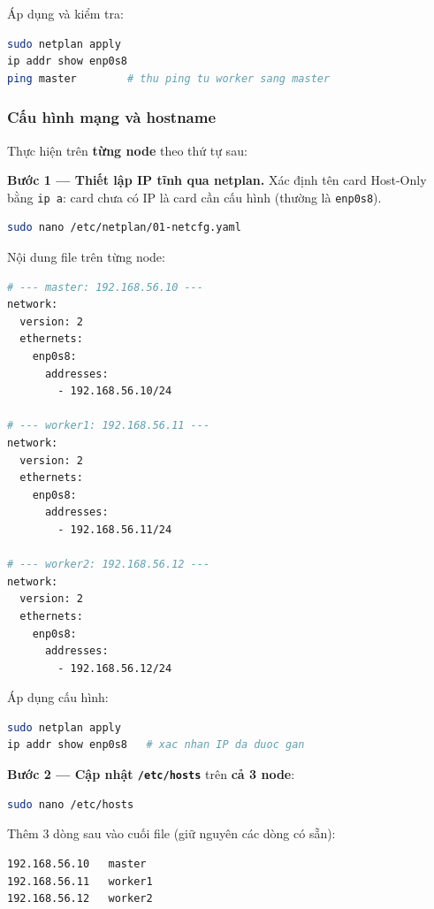 Áp dụng và kiểm tra:

\begin{lstlisting}[language=bash, numbers=none]
sudo netplan apply
ip addr show enp0s8
ping master        # thu ping tu worker sang master
\end{lstlisting}


\subsubsection{Cấu hình mạng và hostname}

Thực hiện trên \textbf{từng node} theo thứ tự sau:

\textbf{Bước 1 — Thiết lập IP tĩnh qua netplan.}
Xác định tên card Host-Only bằng \texttt{ip a}: card chưa có IP là card cần cấu hình (thường là \texttt{enp0s8}).

\begin{lstlisting}[language=bash, numbers=none]
sudo nano /etc/netplan/01-netcfg.yaml
\end{lstlisting}

Nội dung file trên từng node:

\begin{lstlisting}[language=bash, numbers=none]
# --- master: 192.168.56.10 ---
network:
  version: 2
  ethernets:
    enp0s8:
      addresses:
        - 192.168.56.10/24

# --- worker1: 192.168.56.11 ---
network:
  version: 2
  ethernets:
    enp0s8:
      addresses:
        - 192.168.56.11/24

# --- worker2: 192.168.56.12 ---
network:
  version: 2
  ethernets:
    enp0s8:
      addresses:
        - 192.168.56.12/24
\end{lstlisting}

Áp dụng cấu hình:

\begin{lstlisting}[language=bash, numbers=none]
sudo netplan apply
ip addr show enp0s8   # xac nhan IP da duoc gan
\end{lstlisting}

\textbf{Bước 2 — Cập nhật \texttt{/etc/hosts}} trên \textbf{cả 3 node}:

\begin{lstlisting}[language=bash, numbers=none]
sudo nano /etc/hosts
\end{lstlisting}

Thêm 3 dòng sau vào cuối file (giữ nguyên các dòng có sẵn):

\begin{lstlisting}[language=bash, numbers=none]
192.168.56.10   master
192.168.56.11   worker1
192.168.56.12   worker2
\end{lstlisting}

